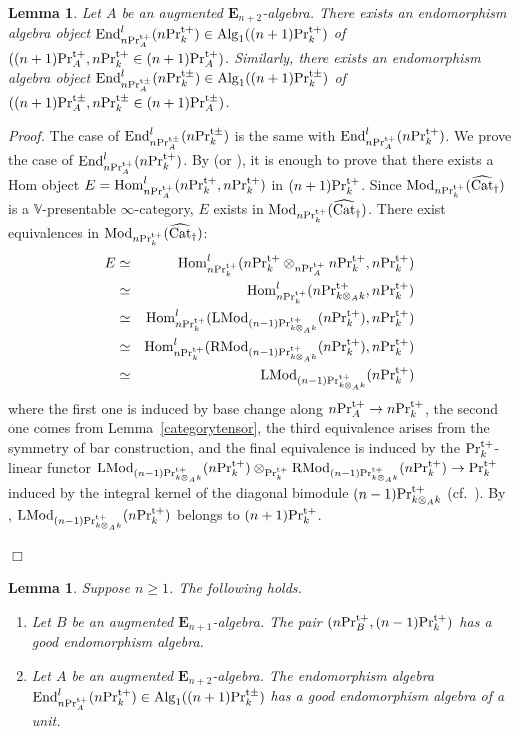 \documentclass[leqno,12pt]{amsart}
\theoremstyle{plain}
\newtheorem{Lemma}[Theorem]{Lemma}
\theoremstyle{definition}
\newcommand{\PRTT}{\textup{Pr}^{\textup{t}+}}
\newcommand{\PRTTT}{\textup{Pr}^{\textup{t}\pm}}
\newcommand{\Hom}{\operatorname{Hom}}
\newcommand{\Mod}{\operatorname{Mod}}
\newcommand{\Alg}{\operatorname{Alg}}
\newcommand{\End}{\operatorname{End}}
\newcommand{\vCat}{\widehat{\operatorname{Cat}}_\dagger}
\newcommand{\LMod}{\operatorname{LMod}}
\newcommand{\RMod}{\operatorname{RMod}}
\newcommand{\Proof}{{\sl Proof.}\quad}
\newcommand{\QED}{{\unskip\nobreak\hfil\penalty50\quad\null\nobreak\hfil
{$\Box$}\parfillskip0pt\finalhyphendemerits0\par\medskip}}
\begin{document}
\begin{Lemma}
\label{endopre}
Let $A$ be an augmented $\mathbf{E}_{n+2}$-algebra.
There exists an endomorphism algebra object
$\End_{n\PRTT_A}^l(n\PRTT_k)\in \Alg_1((n+1)\PRTT_k)$ of $((n+1)\PRTT_A,n\PRTT_k\in (n+1)\PRTT_A)$.
Similarly, there exists an endomorphism algebra object
$\End_{n\PRTTT_A}^l(n\PRTTT_k)\in \Alg_1((n+1)\PRTTT_k)$ of $((n+1)\PRTTT_A, n\PRTTT_k\in (n+1)\PRTTT_A)$.
\end{Lemma}


\Proof
The case of $\End_{n\PRTTT_A}^l(n\PRTTT_k)$ is the same with $\End_{n\PRTT_A}^l(n\PRTT_k)$.
We prove the case of $\End_{n\PRTT_A}^l(n\PRTT_k)$.
By \cite[4.7.1.40, 4.7.1.41]{HA} (or \cite[3.2.2.4]{HA}),
it is enough to prove that there exists a
Hom object $E=\Hom_{n\PRTT_A}^l(n\PRTT_k,n\PRTT_k)$ in $(n+1)\PRTT_k$.
Since $\Mod_{n\PRTT_k}(\vCat)$ is a $\mathbb{V}$-presentable $\infty$-category,
$E$ exists in $\Mod_{n\PRTT_k}(\vCat)$.
There exist equivalences in  $\Mod_{n\PRTT_k}(\vCat)$:
\begin{eqnarray*}
E   &\simeq& \Hom_{n\PRTT_k}^l(n\PRTT_k\otimes_{n\PRTT_A}n\PRTT_k,n\PRTT_k)  \\
&\simeq&  \Hom_{n\PRTT_k}^l(n\PRTT_{k\otimes_Ak},n\PRTT_k)   \\
&\simeq&  \Hom_{n\PRTT_k}^l(\LMod_{(n-1)\PRTT_{k\otimes_Ak}}(n\PRTT_{k}),n\PRTT_k)   \\
&\simeq&  \Hom_{n\PRTT_k}^l(\RMod_{(n-1)\PRTT_{k\otimes_Ak}}(n\PRTT_{k}),n\PRTT_k)   \\
&\simeq&  \LMod_{(n-1)\PRTT_{k\otimes_Ak}}(n\PRTT_{k})
\end{eqnarray*}
where the first one is induced by base change along $n\PRTT_A\to n\PRTT_k$, the second one comes from Lemma~\ref{categorytensor},
the third equivalence arises from the symmetry of bar construction,
and the final equivalence is induced by the $\PRTT_k$-linear functor
$\LMod_{(n-1)\PRTT_{k\otimes_Ak}}(n\PRTT_{k})\otimes_{\PRTT_k} \RMod_{(n-1)\PRTT_{k\otimes_Ak}}(n\PRTT_{k})\to \PRTT_k$
induced by the integral kernel of the diagonal bimodule $(n-1)\PRTT_{k\otimes_Ak}$ (cf.\ \cite[4.8.4.1, 4.8.4.8]{HA}).
By \cite[Proposition 5.1.10]{Ste}, $\LMod_{(n-1)\PRTT_{k\otimes_Ak}}(n\PRTT_{k})$ belongs to $(n+1)\PRTT_k$.
\QED



\begin{Lemma}
\label{goodendoendo}
Suppose  $n\ge1$. The following holds.
\begin{enumerate}
\item
Let $B$ be an augmented $\mathbf{E}_{n+1}$-algebra.
The pair $(n\PRTT_B,(n-1)\PRTT_k)$ has a good endomorphism algebra.

\item
Let $A$ be an augmented $\mathbf{E}_{n+2}$-algebra.
The endomorphism algebra $\End_{n\PRTT_A}^l(n\PRTT_k)\in \Alg_1((n+1)\PRTTT_k)$ has a good endomorphism algebra of a unit.
\end{enumerate}
\end{Lemma}
\end{document}
